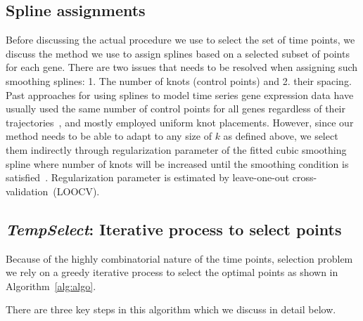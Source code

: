 \documentclass[10pt]{article}
\newcommand{\Tempselect}{\textit{TempSelect}\xspace}
\begin{document}
\subsection{Spline assignments}

Before discussing the actual procedure we use to select the set of
time points, we discuss the method we use to assign splines based on
a selected subset of points for each gene. There are two issues
that needs to be resolved when assigning such smoothing splines: 1.
The number of knots (control points) and 2. their spacing. Past
approaches for using splines to model time series gene expression
data have usually used the same number of control points for all
genes regardless of their trajectories~\cite{bar2012, singh2005}, and mostly employed uniform
knot placements. However, since our method needs to be able to adapt
to any size of $k$ as defined above, we select them indirectly through
regularization parameter of the fitted cubic smoothing spline where number
of knots will be increased until the smoothing condition is
satisfied~\cite{wahba1990}. Regularization parameter is estimated by leave-one-out cross-validation~(LOOCV).

\subsection{\Tempselect: Iterative process to select points}\label{sec:mainalgo}

Because of the highly combinatorial nature of the time points, selection problem we rely on a greedy iterative process to select
the optimal points as shown in Algorithm~\ref{alg:algo}.

There are three key steps in this algorithm which we discuss in
detail below.
\end{document}
